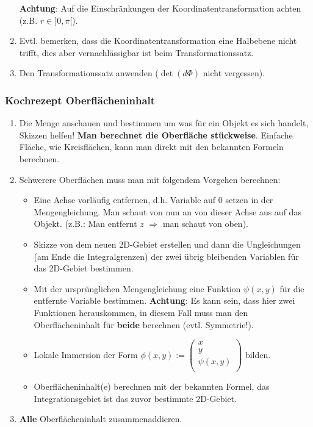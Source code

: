\documentclass[a4paper, fontsize = 8pt, landscape]{scrartcl}
\begin{document}
\begin{multicols*}{3}
\begin{enumerate}
              \textbf{Achtung}: Auf die Einschränkungen der Koordinatentransformation achten (z.B. $r \in ]0,\pi[$).
        \item[1.5] Evtl. bemerken, dass die Koordinatentransformation eine Halbebene nicht trifft, dies aber vernachlässigbar ist beim Transformationssatz.
        \item Den Transformationssatz anwenden ($\det(d\Phi)$ nicht vergessen).
    \end{enumerate}


    \subsubsection{Kochrezept Oberflächeninhalt}

    \begin{enumerate}
        \item Die Menge anschauen und bestimmen um was für ein Objekt es sich handelt, Skizzen helfen! \textbf{Man berechnet die Oberfläche stückweise}. Einfache Fläche, wie Kreisflächen, kann man direkt mit den bekannten Formeln berechnen.
        \item Schwerere Oberflächen muss man mit folgendem Vorgehen berechnen:
              \begin{itemize}
                  \item Eine Achse vorläufig entfernen, d.h. Variable auf $0$ setzen in der Mengengleichung. Man schaut von nun an von dieser Achse aus auf das Objekt. (z.B.: Man entfernt $z$ $\Rightarrow$ man schaut von oben).
                  \item Skizze von dem neuen 2D-Gebiet erstellen und dann die Ungleichungen (am Ende die Integralgrenzen) der zwei übrig bleibenden Variablen für das 2D-Gebiet bestimmen.
                  \item Mit der ursprünglichen Mengengleichung eine Funktion $\psi(x,y)$ für die entfernte Variable bestimmen. \textbf{Achtung}: Es kann sein, dass hier zwei Funktionen herauskommen, in diesem Fall muss man den Oberflächeninhalt für \textbf{beide} berechnen (evtl. Symmetrie!).
                  \item Lokale Immersion der Form $\phi(x,y) := \begin{pmatrix}
                                x \\ y \\ \psi(x,y) \\
                            \end{pmatrix}$ bilden.
                  \item Oberflächeninhalt(e) berechnen mit der bekannten Formel, das Integrationsgebiet ist das zuvor bestimmte 2D-Gebiet.
              \end{itemize}
        \item \textbf{Alle} Oberflächeninhalt zusammenaddieren.
    \end{enumerate}





\end{multicols*}
\end{document}
